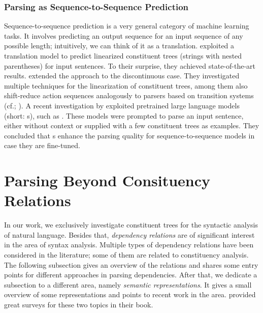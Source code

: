 \documentclass[../document.tex]{subfiles}
\begin{document}
    \subsubsection*{Parsing as Sequence-to-Sequence Prediction}
    Sequence-to-sequence prediction is a very general category of machine learning tasks.
    It involves predicting an output sequence for an input sequence of any possible length; intuitively, we can think of it as a translation.
     exploited a translation model to predict linearized constituent trees (strings with nested parentheses) for input sentences.
    To their surprise, they achieved state-of-the-art results.
     extended the approach to the discontinuous case.
    They investigated multiple techniques for the linearization of constituent trees, among them also shift-reduce action sequences analogously to parsers based on transition systems (cf.\@ \citealp{Ma2017DeterministicAF}; \citealp{liu-zhang-2017-encoder}).
    A recent investigation by \citet{bai2023constituency} exploited pretrained large language models (short: s), such as  \citep{openai2023gpt4}.
    These models were prompted to parse an input sentence, either without context or supplied with a few constituent trees as examples.
    They concluded that s enhance the parsing quality for sequence-to-sequence models in case they are fine-tuned.

    \section{Parsing Beyond Consituency Relations}\label{sec:literature:beyond}
    In our work, we exclusively investigate constituent trees for the syntactic analysis of natural language.
    Besides that, \emph{dependency relations} are of significant interest in the area of syntax analysis.
    Multiple types of dependency relations have been considered in the literature; some of them are related to constituency analysis.
    The following subsection gives an overview of the relations and shares some entry points for different approaches in parsing dependencies.
    After that, we dedicate a subsection to a different area, namely \emph{semantic representations}.
    It gives a small overview of some representations and points to recent work in the area.
     provided great surveys for these two topics in their book.
\end{document}
